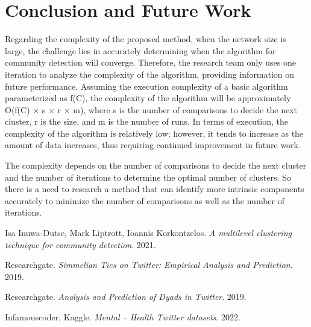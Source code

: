 \documentclass[conference]{IEEEtran}
\begin{document}
\section{Conclusion and Future Work}
Regarding the complexity of the proposed method, when the network size is large, the challenge lies in accurately determining when the algorithm for community detection will converge.
Therefore, the research team only uses one iteration to analyze the complexity of the algorithm, providing information on future performance. Assuming the execution complexity of a basic algorithm parameterized as f(C), the complexity of the algorithm will be approximately O(f(C) × s × r × m),
where s is the number of comparisons to decide the next cluster, r is the size, and m is the number of runs. In terms of execution, the complexity of the algorithm is relatively low; however, it tends to increase as the amount of data increases, thus requiring continued improvement in future work.

The complexity depends on the number of comparisons to decide the next cluster and the number of iterations to determine the optimal number of clusters.
So there is a need to research a method that can identify more intrinsic components accurately to minimize the number of comparisons as well as the number of iterations.
\begin{thebibliography}{9}
    Isa Inuwa-Dutse, Mark Liptrott, Ioannis Korkontzelos.
    \textit{A multilevel clustering technique for community detection}.
    2021.

    Researchgate.
    \textit{Simmelian Ties on Twitter: Empirical Analysis and Prediction}.
    2019.

    Researchgate.
    \textit{Analysis and Prediction of Dyads in Twitter}.
    2019.

    Infamouscoder, Kaggle.
    \textit{Mental – Health Twitter datasets}.
    2022.
\end{thebibliography}
\end{document}
